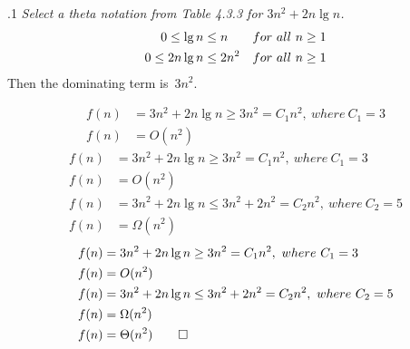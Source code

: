 \documentclass{beamer}
\begin{document}
        \begin{frame}[c,shrink]{\subsecname{}.1}
            \textit{Select a theta notation from Table 4.3.3 for $3n^2+2n\lg{n}$.}\pause     
            \begin{align*}
                0 \leq \lg{n}		&\leq n 	\hfill &for\ all\ n \geq 1\\
                0 \leq 2n\lg{n} 	&\leq 2n^2 \hfill &for\ all\ n \geq 1
            \end{align*}\pause
            Then the dominating term is\ $3n^2$.\\ \pause
            \begin{overprint}
            \begin{align*}
            f(n)&= 3n^2+2n\lg{n} \geq 3n^2=C_1n^2,\ where\ C_1=3\\
            f(n)&=O(n^2)
            \end{align*}
            \begin{align*}
            f(n)&= 3n^2+2n\lg{n} \geq 3n^2=C_1n^2,\ where\ C_1=3\\
            f(n)&=O(n^2)\\
            f(n)&= 3n^2+2n\lg{n} \leq 3n^2+2n^2=C_2n^2,\ where\ C_2=5\\
            f(n)&=\Omega(n^2)
            \end{align*}
            \begin{align*}
            f(n)	&= 3n^2+2n\lg{n} \geq 3n^2=C_1n^2,\ where\ C_1=3\\
            f(n)	&= O(n^2)\\
            f(n)	&= 3n^2+2n\lg{n} \leq 3n^2+2n^2=C_2n^2,\ where\ C_2=5\\
            f(n)	&= \Omega(n^2)\\
            f(n)	&= \Theta(n^2)  \qed
            \end{align*}
            \end{overprint}
        \end{frame}
        
\end{document}
